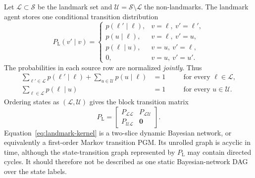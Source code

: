 \documentclass[11pt]{article}
\begin{document}
Let $\mathcal L\subset\mathcal S$ be the landmark set and
$\mathcal U=\mathcal S\setminus\mathcal L$ the non-landmarks. The landmark agent stores
one conditional transition distribution
\begin{equation}
P_{\mathrm L}(v'\mid v)
=
\begin{cases}
p(\ell'\mid\ell),
& v=\ell,\ v'=\ell',\\
p(u\mid\ell),
& v=\ell,\ v'=u,\\
p(\ell\mid u),
& v=u,\ v'=\ell,\\
0,
& v=u,\ v'=u'.
\end{cases}
\label{eq:landmark-kernel}
\end{equation}
The probabilities in each source row are normalized \emph{jointly}. Thus
\begin{align}
\sum_{\ell'\in\mathcal L}p(\ell'\mid\ell)
+\sum_{u\in\mathcal U}p(u\mid\ell)&=1
\quad &&\text{for every }\ell\in\mathcal L,
\label{eq:row-landmark}\\
\sum_{\ell\in\mathcal L}p(\ell\mid u)&=1
\quad &&\text{for every }u\in\mathcal U.
\label{eq:row-nonlandmark}
\end{align}
Ordering states as $(\mathcal L,\mathcal U)$ gives the block transition matrix
\begin{equation}
P_{\mathrm L}
=
\begin{bmatrix}
P_{\mathcal L\mathcal L} & P_{\mathcal L\mathcal U}\\
P_{\mathcal U\mathcal L} & \mathbf 0
\end{bmatrix}.
\label{eq:block-matrix}
\end{equation}
Equation~\eqref{eq:landmark-kernel} is a two-slice dynamic Bayesian network, or
equivalently a first-order Markov transition PGM. Its unrolled graph is acyclic in time,
although the state-transition graph represented by $P_{\mathrm L}$ may contain directed
cycles. It should therefore not be described as one static Bayesian-network DAG over the
state labels.
\end{document}

